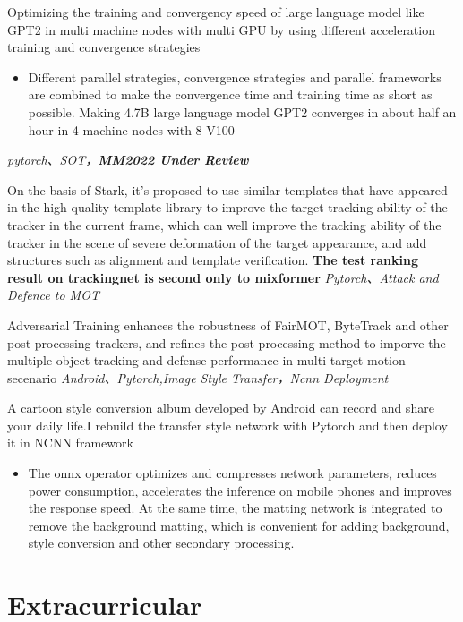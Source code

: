 \documentclass{uniquecv}
\begin{document}
Optimizing the training and convergency speed of large language model like GPT2 in multi machine nodes with multi GPU by using different acceleration training and convergence strategies
\begin{itemize}
  \item Different parallel strategies, convergence strategies and parallel frameworks are combined to make the convergence time and training time as short as possible. Making 4.7B large language model GPT2 converges in about half an hour in 4 machine nodes with 8 V100
\end{itemize}
\textit{pytorch、SOT，\textbf{MM2022 Under Review}}
\vspace{0.4ex}

On the basis of Stark, it's proposed to use similar templates that have appeared in the high-quality template library to improve the target tracking ability of the tracker in the current frame, which can well improve the tracking ability of the tracker in the scene of severe deformation of the target appearance, and add structures such as alignment and template verification. \textbf{The test ranking result on trackingnet is second only to mixformer}
\textit{Pytorch、Attack and Defence to MOT}
\vspace{0.4ex}

Adversarial Training enhances the robustness of FairMOT, ByteTrack and other post-processing trackers, and refines the post-processing method to imporve the multiple object tracking and defense performance in multi-target motion secenario
\textit{Android、Pytorch,Image Style Transfer，Ncnn Deployment}
\vspace{0.4ex}

A cartoon style conversion album developed by Android can record and share your daily life.I rebuild the transfer style network with Pytorch and then deploy it in NCNN 
framework 
\begin{itemize}
  \item The onnx operator optimizes and compresses network parameters, reduces power consumption, accelerates the inference on mobile phones and improves the response speed. At the same time, the matting network is integrated to remove the background matting, which is convenient for adding background, style conversion and other secondary processing.
\end{itemize}
\section{Extracurricular}
\end{document}
